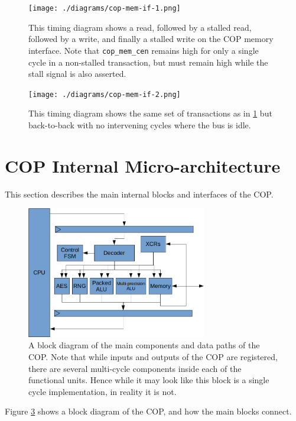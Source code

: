 \documentclass{article}
\begin{document}
\begin{figure}[H]
\centering
\texttt{[image: ./diagrams/cop-mem-if-1.png]}
\caption{This timing diagram shows a read, followed by a stalled read,
followed by a write, and finally a stalled write on the COP memory interface.
Note that {\tt cop\_mem\_cen} remains high for only a single cycle in a
non-stalled transaction, but must remain high while the stall signal is also
asserted.}
\label{fig:cop-mem-if-waves-1}
\end{figure}

\begin{figure}[h]
\centering
\texttt{[image: ./diagrams/cop-mem-if-2.png]}
\caption{This timing diagram shows the same set of transactions as in
\ref{fig:cop-mem-if-waves-1} but back-to-back with no intervening cycles
where the bus is idle.}
\label{fig:cop-mem-if-waves-2}
\end{figure}


\section{COP Internal Micro-architecture}
\label{sec:cop-microarch}

This section describes the main internal blocks and interfaces of the COP.

\begin{figure}[H]
\centering
\includegraphics[width=0.7\textwidth]{diagrams/cop-block-diagram.png}
\caption{A block diagram of the main components and data paths of
the COP. Note that while inputs and outputs of the COP are registered,
there are several multi-cycle components inside each of the functional
units. Hence while it may look like this block is a single cycle
implementation, in reality it is not.}
\label{fig:cop-block-diagram}
\end{figure}

Figure \ref{fig:cop-block-diagram} shows a block diagram of the COP,
and how the main blocks connect.
\end{document}
